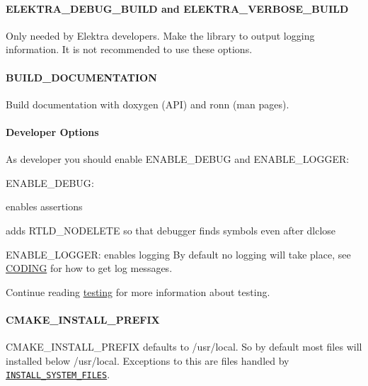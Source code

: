 \paragraph*{{\ttfamily E\+L\+E\+K\+T\+R\+A\+\_\+\+D\+E\+B\+U\+G\+\_\+\+B\+U\+I\+LD} and {\ttfamily E\+L\+E\+K\+T\+R\+A\+\_\+\+V\+E\+R\+B\+O\+S\+E\+\_\+\+B\+U\+I\+LD}}

Only needed by Elektra developers. Make the library to output logging information. It is not recommended to use these options.

\paragraph*{B\+U\+I\+L\+D\+\_\+\+D\+O\+C\+U\+M\+E\+N\+T\+A\+T\+I\+ON}

Build documentation with doxygen (A\+PI) and ronn (man pages).

\paragraph*{Developer Options}

As developer you should enable {\ttfamily E\+N\+A\+B\+L\+E\+\_\+\+D\+E\+B\+UG} and {\ttfamily E\+N\+A\+B\+L\+E\+\_\+\+L\+O\+G\+G\+ER}\+:


\begin{DoxyItemize}
\item {\ttfamily E\+N\+A\+B\+L\+E\+\_\+\+D\+E\+B\+UG}\+:
\begin{DoxyItemize}
\item enables assertions
\item adds R\+T\+L\+D\+\_\+\+N\+O\+D\+E\+L\+E\+TE so that debugger finds symbols even after dlclose
\end{DoxyItemize}
\item {\ttfamily E\+N\+A\+B\+L\+E\+\_\+\+L\+O\+G\+G\+ER}\+: enables logging By default no logging will take place, see \hyperlink{doc_CODING_md}{C\+O\+D\+I\+NG} for how to get log messages.
\end{DoxyItemize}

Continue reading \hyperlink{doc_TESTING_md}{testing} for more information about testing.

\paragraph*{{\ttfamily C\+M\+A\+K\+E\+\_\+\+I\+N\+S\+T\+A\+L\+L\+\_\+\+P\+R\+E\+F\+IX}}

{\ttfamily C\+M\+A\+K\+E\+\_\+\+I\+N\+S\+T\+A\+L\+L\+\_\+\+P\+R\+E\+F\+IX} defaults to {\ttfamily /usr/local}. So by default most files will installed below {\ttfamily /usr/local}. Exceptions to this are files handled by \href{#install_system_files}{\tt I\+N\+S\+T\+A\+L\+L\+\_\+\+S\+Y\+S\+T\+E\+M\+\_\+\+F\+I\+L\+ES}.

